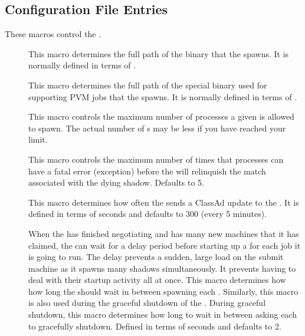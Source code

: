 \subsection{\label{sec:Schedd-Config-File-Entries}
 Configuration File Entries}

These macros control the .
\begin{description}

\item[] \label{param:Shadow} This macro determines the
  full path of the  binary that the 
  spawns.  It is normally defined in terms of . 
  
\item[] \label{param:ShadowPvm} This macro
  determines the full path of the special  binary
  used for supporting PVM jobs that the  spawns.  It is
  normally defined in terms of .

\item[] \label{param:MaxJobsRunning} This
  macro controls the maximum number of  processes
  a given  is allowed to spawn.  The actual
  number of s may be less if you have reached
  your  limit.

\item[]
  \label{param:MaxShadowExceptions} This macro controls the maximum
  number of times that  processes can have a fatal
  error (exception) before the  will relinquish
  the match associated with the dying shadow.  Defaults to 5.

\item[] \label{param:ScheddInterval}  This
  macro determines how often the  sends a ClassAd
  update to the .  It is defined in terms of seconds
  and defaults to 300 (every 5 minutes).
  
\item[] \label{param:JobStartDelay} When the
   has finished negotiating and has many new
  machines that it has claimed, the  can wait
  for a delay period before starting up a  for each job
  it is going to run.  The delay prevents a sudden, large load on the submit
  machine as it spawns many shadows simultaneously. It prevents
  having to deal
  with their startup activity all at once.  This macro determines how
  how long the  should wait in between spawning each
  .  
  Similarly, this macro is also used during the graceful shutdown of the
  .
  During graceful shutdown, this macro determines how long to wait in
  between asking each  to gracefully shutdown.  
  Defined in terms of seconds and defaults to 2. 
  

\end{description}
